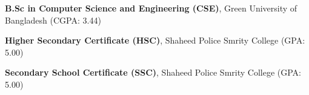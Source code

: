 %
%
%


\begin{scholarship}
					{\textbf{B.Sc in Computer Science and Engineering (CSE)}, Green University of Bangladesh (CGPA: 3.44)}
				
					{\textbf{Higher Secondary Certificate (HSC)}, Shaheed Police Smrity College (GPA: 5.00)}
					
					{\textbf{Secondary School Certificate (SSC)}, Shaheed Police Smrity College (GPA: 5.00)}
	
\end{scholarship}